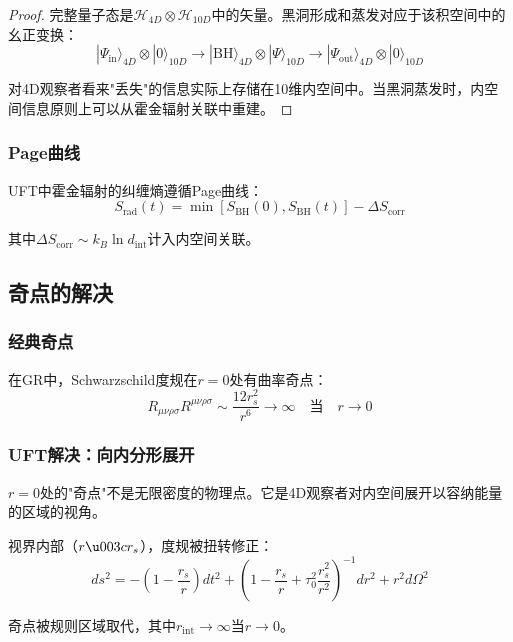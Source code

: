 \begin{proof}
完整量子态是$\mathcal{H}_{4D} \otimes \mathcal{H}_{10D}$中的矢量。黑洞形成和蒸发对应于该积空间中的幺正变换：
\begin{equation}
    |\Psi_{\text{in}}\rangle_{4D} \otimes |0\rangle_{10D} \to |\text{BH}\rangle_{4D} \otimes |\Psi\rangle_{10D} \to |\Psi_{\text{out}}\rangle_{4D} \otimes |0\rangle_{10D}
\end{equation}

对4D观察者看来"丢失"的信息实际上存储在10维内空间中。当黑洞蒸发时，内空间信息原则上可以从霍金辐射关联中重建。
\end{proof}

\subsubsection{Page曲线}

UFT中霍金辐射的纠缠熵遵循Page曲线：
\begin{equation}
    S_{\text{rad}}(t) = \min\left[S_{\text{BH}}(0), S_{\text{BH}}(t)\right] - \Delta S_{\text{corr}}
\end{equation}

其中$\Delta S_{\text{corr}} \sim k_B \ln d_{\text{int}}$计入内空间关联。

\subsection{奇点的解决}

\subsubsection{经典奇点}

在GR中，Schwarzschild度规在$r = 0$处有曲率奇点：
\begin{equation}
    R_{\mu\nu\rho\sigma}R^{\mu\nu\rho\sigma} \sim \frac{12r_s^2}{r^6} \to \infty \quad \text{当} \quad r \to 0
\end{equation}

\subsubsection{UFT解决：向内分形展开}

\begin{insight}[奇点是视角效应]
$r = 0$处的"奇点"不是无限密度的物理点。它是4D观察者对内空间展开以容纳能量的区域的视角。
\end{insight}

\begin{theorem}[UFT黑洞的内部结构]
视界内部（$r \u003c r_s$），度规被扭转修正：
\begin{equation}
    ds^2 = -\left(1 - \frac{r_s}{r}\right)dt^2 + \left(1 - \frac{r_s}{r} + \tau_0^2\frac{r_s^2}{r^2}\right)^{-1}dr^2 + r^2 d\Omega^2
\end{equation}

奇点被规则区域取代，其中$r_{\text{int}} \to \infty$当$r \to 0$。
\end{theorem}


